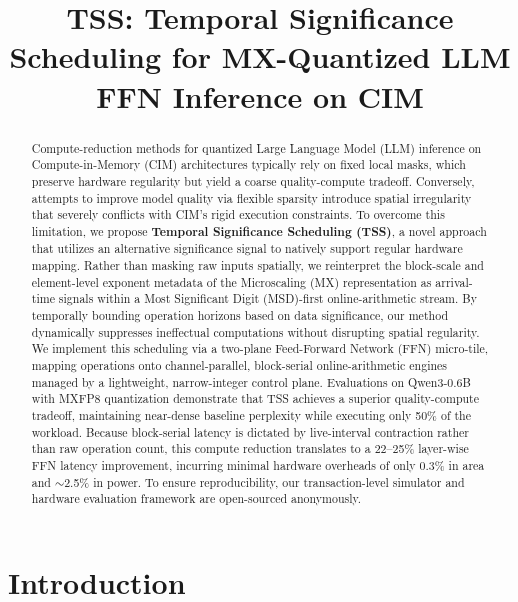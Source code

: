 \documentclass[sigconf]{acmart}
\begin{document}
\title{TSS: Temporal Significance Scheduling for MX-Quantized LLM FFN Inference on CIM}


\begin{abstract}
    Compute-reduction methods for quantized Large Language Model (LLM) inference on Compute-in-Memory (CIM) architectures typically rely on fixed local masks, which preserve hardware regularity but yield a coarse quality-compute tradeoff. Conversely, attempts to improve model quality via flexible sparsity introduce spatial irregularity that severely conflicts with CIM's rigid execution constraints. To overcome this limitation, we propose \textbf{Temporal Significance Scheduling (TSS)}, a novel approach that utilizes an alternative significance signal to natively support regular hardware mapping. Rather than masking raw inputs spatially, we reinterpret the block-scale and element-level exponent metadata of the Microscaling (MX) representation as arrival-time signals within a Most Significant Digit (MSD)-first online-arithmetic stream. By temporally bounding operation horizons based on data significance, our method dynamically suppresses ineffectual computations without disrupting spatial regularity. We implement this scheduling via a two-plane Feed-Forward Network (FFN) micro-tile, mapping operations onto channel-parallel, block-serial online-arithmetic engines managed by a lightweight, narrow-integer control plane. Evaluations on Qwen3-0.6B with MXFP8 quantization demonstrate that TSS achieves a superior quality-compute tradeoff, maintaining near-dense baseline perplexity while executing only 50\% of the workload. Because block-serial latency is dictated by live-interval contraction rather than raw operation count, this compute reduction translates to a 22--25\% layer-wise FFN latency improvement, incurring minimal hardware overheads of only 0.3\% in area and ${\sim}$2.5\% in power. To ensure reproducibility, our transaction-level simulator and hardware evaluation framework are open-sourced anonymously.
\end{abstract}



\maketitle

\section{Introduction}
\label{sec:intro}
\end{document}
